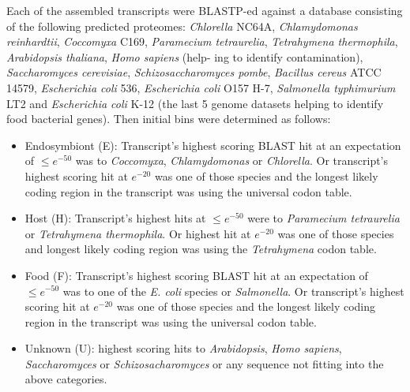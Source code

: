 Each of the assembled transcripts were BLASTP-ed against a database consisting of the following predicted proteomes: 
\textit{Chlorella} NC64A, \textit{Chlamydomonas reinhardtii}, \textit{Coccomyxa} C169,
\textit{Paramecium tetraurelia}, \textit{Tetrahymena thermophila}, \textit{Arabidopsis thaliana}, \textit{Homo sapiens} (help-
    ing to identify contamination), \textit{Saccharomyces cerevisiae}, \textit{Schizosaccharomyces pombe}, \textit{Bacillus
cereus} ATCC 14579, \textit{Escherichia coli} 536, \textit{Escherichia coli} O157 H-7, \textit{Salmonella typhimurium}
LT2 and \textit{Escherichia coli} K-12 (the last 5 genome datasets helping to identify food bacterial
genes). Then initial bins were determined as follows:
\begin{itemize}
    \item Endosymbiont (E): Transcript’s highest scoring BLAST hit at an expectation of \(\leq e^{-50}\) was to \textit{Coccomyxa},
        \textit{Chlamydomonas} or \textit{Chlorella}. Or transcript’s highest scoring hit at \(e^{-20}\) was one of those
species and the longest likely coding region in the transcript was using the universal codon
table.
\item Host (H): Transcript’s highest hits at \(\leq e^{-50}\) were to \textit{Paramecium tetraurelia} or \textit{Tetrahymena
        thermophila}. Or highest hit at \(e^{-20}\) was one of those species and longest likely coding
    region was using the \textit{Tetrahymena} codon table.
\item Food (F): Transcript’s highest scoring BLAST hit at an expectation of \(\leq e^{-50}\) was to one of the \textit{E. coli} species
    or \textit{Salmonella}. Or transcript’s highest scoring hit at \(e^{-20}\) was one of those species and
the longest likely coding region in the transcript was using the universal codon table.
\item Unknown (U): highest scoring hits to \textit{Arabidopsis}, \textit{Homo sapiens}, \textit{Saccharomyces} or \textit{Schizosacharomyces} 
    or any sequence not fitting into the above categories.
\end{itemize}

